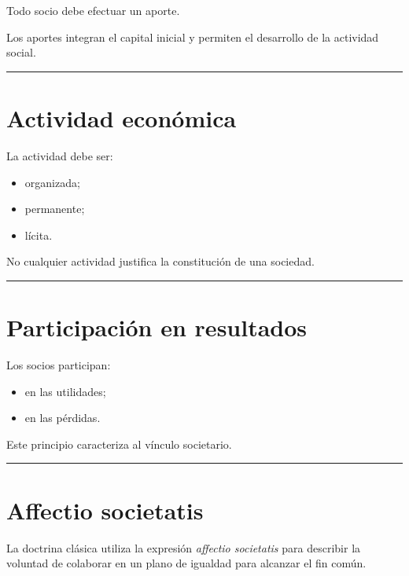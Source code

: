 \documentclass[
  spanish,
  letterpaper,
  DIV=11,
  numbers=noendperiod]{scrartcl}
\providecommand{\tightlist}{%
  \setlength{\itemsep}{0pt}\setlength{\parskip}{0pt}}
\begin{document}
Todo socio debe efectuar un aporte.

Los aportes integran el capital inicial y permiten el desarrollo de la
actividad social.

\begin{center}\rule{0.5\linewidth}{0.5pt}\end{center}

\section{Actividad económica}\label{actividad-econuxf3mica}

La actividad debe ser:

\begin{itemize}
\tightlist
\item
  organizada;
\item
  permanente;
\item
  lícita.
\end{itemize}

No cualquier actividad justifica la constitución de una sociedad.

\begin{center}\rule{0.5\linewidth}{0.5pt}\end{center}

\section{Participación en
resultados}\label{participaciuxf3n-en-resultados}

Los socios participan:

\begin{itemize}
\tightlist
\item
  en las utilidades;
\item
  en las pérdidas.
\end{itemize}

Este principio caracteriza al vínculo societario.

\begin{center}\rule{0.5\linewidth}{0.5pt}\end{center}

\section{Affectio societatis}\label{affectio-societatis}

La doctrina clásica utiliza la expresión \emph{affectio societatis} para
describir la voluntad de colaborar en un plano de igualdad para alcanzar
el fin común.
\end{document}
